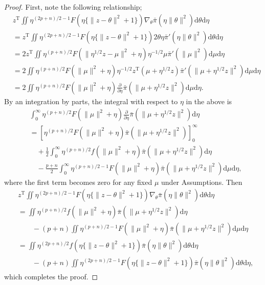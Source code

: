\documentclass[preprint,11pt]{imsart}
\numberwithin{equation}{section}
\theoremstyle{plain}
\theoremstyle{definition}
\theoremstyle{remark}
\def\T{{ \mathrm{\scriptscriptstyle T} }}
\newcommand{\rd}{\mathrm{d}}
\begin{document}
 \begin{proof}
First, note the following relationship;
 \begin{align*}
& z^\T\iint 
  \eta^{(2p+n)/2-1} F(\eta\{\|z-\theta\|^2+1\}) 
\nabla_\theta \bar{\pi}(\eta\|\theta\|^2) \rd \theta   \rd \eta \\
& =z^\T\iint 
  \eta^{(2p+n)/2-1} F(\eta\{\|z-\theta\|^2+1\}) 
2\theta\eta \bar{\pi}'(\eta\|\theta\|^2) \rd \theta   \rd \eta \\
& =2z^\T\iint 
  \eta^{(p+n)/2} F(\|\eta^{1/2}z-\mu\|^2+\eta) 
\eta^{-1/2}\mu \bar{\pi}'(\|\mu\|^2) \rd \mu   \rd \eta \\
& =2\iint 
  \eta^{(p+n)/2} F(\|\mu\|^2+\eta) 
\eta^{-1/2}z^\T(\mu+\eta^{1/2}z) \bar{\pi}'(\|\mu+\eta^{1/2}z\|^2) \rd \mu   \rd \eta \\
& =2\iint 
  \eta^{(p+n)/2} F(\|\mu\|^2+\eta) 
  \frac{\partial}{\partial \eta}\bar{\pi}(\|\mu+\eta^{1/2}z\|^2) \rd \mu   \rd \eta.
 \end{align*}
By an integration by parts, the integral with respect to $\eta$ in the above is   
  \begin{align*}
&\int_0^\infty   \eta^{(p+n)/2} F(\|\mu\|^2+\eta) 
  \frac{\partial}{\partial \eta}\bar{\pi}(\|\mu+\eta^{1/2}z\|^2) \rd \eta \\
&=\left[\eta^{(p+n)/2} F(\|\mu\|^2+\eta)   \bar{\pi}(\|\mu+\eta^{1/2}z\|^2) \right]_0^\infty  \\
  &\quad +\frac{1}{2}\int_0^\infty
 \eta^{(p+n)/2} f(\|\mu\|^2+\eta) \bar{\pi}(\|\mu+\eta^{1/2}z\|^2)  \rd \eta \\
& \quad -\frac{p+n}{2}\int_0^\infty \eta^{(p+n)/2-1} F(\|\mu\|^2+\eta) \bar{\pi}(\|\mu+\eta^{1/2}z\|^2) \rd \mu   \rd \eta,
  \end{align*}
  where the first term becomes zero for any fixed $\mu$ under Assumptions.
Then
  \begin{align*}
& z^\T\iint 
  \eta^{(2p+n)/2-1} F(\eta\{\|z-\theta\|^2+1\}) 
\nabla_\theta \bar{\pi}(\eta\|\theta\|^2) \rd \theta   \rd \eta \\
&=\iint
 \eta^{(p+n)/2} f(\|\mu\|^2+\eta) \bar{\pi}(\|\mu+\eta^{1/2}z\|^2)  \rd \eta \\
& \qquad -(p+n)\iint \eta^{(p+n)/2-1} F(\|\mu\|^2+\eta) \bar{\pi}(\|\mu+\eta^{1/2}z\|^2) \rd \mu   \rd \eta \\
   &=\iint 
 \eta^{(2p+n)/2} f(\eta\{\|z-\theta\|^2+1\}) \bar{\pi}(\eta\|\theta\|^2) \rd \theta   \rd \eta \\
&\qquad -(p+n)\iint 
\eta^{(2p+n)/2-1} F(\eta\{\|z-\theta\|^2+1\}) \bar{\pi}(\eta\|\theta\|^2) \rd \theta   \rd \eta, 
  \end{align*}
  which completes the proof.
 \end{proof}
\end{document}
